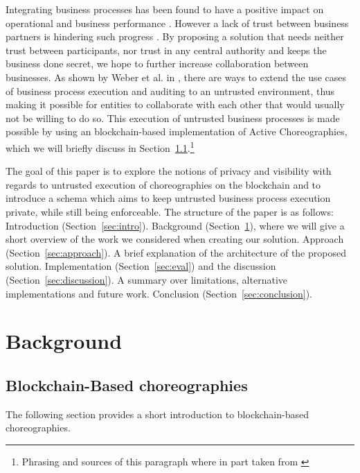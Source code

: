 \documentclass[runningheads]{llncs}
\newcommand{\refsec}[1]{Section~\ref{#1}}
\begin{document}
Integrating business processes has been found to have a positive impact on operational and business performance \cite{flynn2010impact,narayanan2011antecedents}. However a lack of trust between business partners is hindering such progress \cite{panayides2009impact}. By proposing a solution that needs neither trust between participants, nor trust in any central authority and keeps the business done secret, we hope to further increase collaboration between businesses. As shown by Weber et al. in \cite{weber2016untrusted}, there are ways to extend the use cases of business process execution and auditing to an untrusted environment, thus making it possible for entities to collaborate with each other that would usually not be willing to do so. This execution of untrusted business processes is made possible by using an blockchain-based implementation of Active Choreographies, which we will briefly discuss in \refsec{subsec:blockchainbased}.\footnote{Phrasing and sources of this paragraph where in part taken from \cite{weber2016untrusted}} 

The goal of this paper is to explore the notions of privacy and visibility with regards to untrusted execution of choreographies on the blockchain and to introduce a schema which aims to keep untrusted business process execution private, while still being enforceable. The structure of the paper is as follows: Introduction (\refsec{sec:intro}).  Background (\refsec{sec:background}), where we will give a short overview of the work we considered when creating our solution. Approach (\refsec{sec:approach}). A brief explanation of the architecture of the proposed solution. Implementation (\refsec{sec:eval}) and the discussion (\refsec{sec:discussion}). A summary over limitations, alternative implementations and future work. Conclusion (\refsec{sec:conclusion}).


\section{Background} \label{sec:background}

\subsection{Blockchain-Based choreographies} \label{subsec:blockchainbased}

The following section provides a short introduction to blockchain-based choreographies. 
\end{document}
